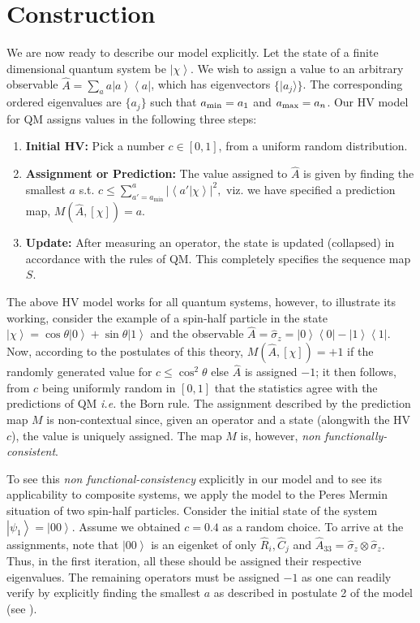 \documentclass[doublecol,british]{epl2}
\theoremstyle{plain}
\theoremstyle{plain}
\theoremstyle{definition}
\theoremstyle{remark}
\theoremstyle{remark}
\theoremstyle{remark}
\theoremstyle{plain}
\theoremstyle{plain}
\theoremstyle{plain}
\theoremstyle{definition}
\theoremstyle{definition}
\begin{document}
\section{Construction}
We are now ready to describe our 
model explicitly.
Let the state of a finite dimensional quantum
system be $\left|\chi\right\rangle $. We wish to
assign a value to an arbitrary observable
$\hat{A}=\sum_{a}a\left|a\right\rangle
\left\langle a\right|$, which has eigenvectors $\{
\vert a_j\rangle \}$. The corresponding ordered
eigenvalues are $\{a_j\}$ such that $a_{\rm
min}=a_1$ and $a_{\rm max}=a_n$.  Our HV model for
QM assigns values in the following three steps:
\setdefaultleftmargin{0pt}{}{}{}{}{}
\begin{enumerate}
\item
{\bf  Initial HV:} Pick a number
$c\in[0,1]$, from a uniform random distribution.\
\item
{\bf
Assignment or Prediction:}
 The value assigned to
$\hat{A}$ is given by finding the smallest $a$
s.t.  $c\le\sum_{a'=a_{\text{min}}}^{a}\left|\left\langle
a'|\chi\right\rangle \right|^{2},$ viz. we have
specified a prediction map, $M(\hat{A},[\chi ])=a$.
\item
{\bf  Update:} After measuring an operator, the state is
updated (collapsed) in accordance with the rules
of QM. This completely specifies the sequence map
$S$.
\end{enumerate}
The above HV model works for all quantum systems,
however, to illustrate its working,
consider the example of a spin-half particle in the state
$\left|\chi\right\rangle
=\cos\theta\left|0\right\rangle
+\sin\theta\left|1\right\rangle $ and the observable
$\hat{A}=\hat{\sigma}_{z}=\left|0\right\rangle
\left\langle 0\right|-\left|1\right\rangle
\left\langle 1\right|$. Now, according to the
postulates of this theory, $M(\hat{A},[\chi])=+1$
if
the randomly generated value for 
$c\le\cos^{2}\theta$ else $\hat{A}$ is assigned
$-1$; it then follows,  from $c$ being uniformly
random in $[0,1]$ that the statistics agree with
the predictions of QM {\it i.e.}  the
Born rule. 
The assignment described by the
prediction map $M$ is non-contextual since, given
an operator and a state (alongwith the HV $c$), the value is
uniquely assigned. The map $M$ is, however,
\emph{non functionally-consistent}.

{ To see this \emph{non functional-consistency} explicitly in} our model and to see its
applicability to composite systems,
we apply the model to the Peres Mermin situation of two
spin-half particles. Consider the initial state of
the system 
$\left|\psi_{1}\right\rangle
=\left|00\right\rangle $. Assume we 
obtained $c=0.4$ as a random choice. To arrive
at the assignments, note that
$\left|00\right\rangle $ is an eigenket of only
$\hat{R}_{i},\hat{C}_{j}$ and
$\hat{A}_{33}=\hat{\sigma}_{z}\otimes\hat{\sigma}_{z}$.
Thus, in the first iteration, all these should be
assigned their respective eigenvalues. The
remaining operators must be assigned $-1$ as one
can readily verify by explicitly finding the
smallest $a$ as described in postulate 2 of the
model (see ). 
\end{document}
